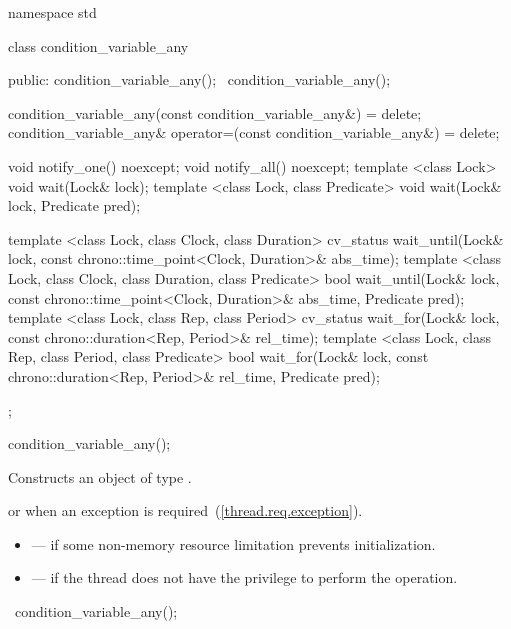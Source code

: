 \begin{codeblock}
namespace std {
  class condition_variable_any {
  public:
    condition_variable_any();
    ~condition_variable_any();

    condition_variable_any(const condition_variable_any&) = delete;
    condition_variable_any& operator=(const condition_variable_any&) = delete;

    void notify_one() noexcept;
    void notify_all() noexcept;
    template <class Lock>
      void wait(Lock& lock);
    template <class Lock, class Predicate>
      void wait(Lock& lock, Predicate pred);

    template <class Lock, class Clock, class Duration>
      cv_status wait_until(Lock& lock, const chrono::time_point<Clock, Duration>& abs_time);
    template <class Lock, class Clock, class Duration, class Predicate>
      bool wait_until(Lock& lock, const chrono::time_point<Clock, Duration>& abs_time,
        Predicate pred);
    template <class Lock, class Rep, class Period>
      cv_status wait_for(Lock& lock, const chrono::duration<Rep, Period>& rel_time);
    template <class Lock, class Rep, class Period, class Predicate>
      bool wait_for(Lock& lock, const chrono::duration<Rep, Period>& rel_time,
        Predicate pred);
  };
}
\end{codeblock}

%
\begin{itemdecl}
condition_variable_any();
\end{itemdecl}

\begin{itemdescr}
\pnum
\effects Constructs an object of type .

\pnum
\throws {} or  when an exception is
required~(\ref{thread.req.exception}).

\pnum
\errors
\begin{itemize}
\item {} --- if some non-memory resource
limitation prevents initialization.

\item {} --- if the thread does not have the
privilege to perform the operation.
\end{itemize}
\end{itemdescr}

%
\begin{itemdecl}
~condition_variable_any();
\end{itemdecl}


